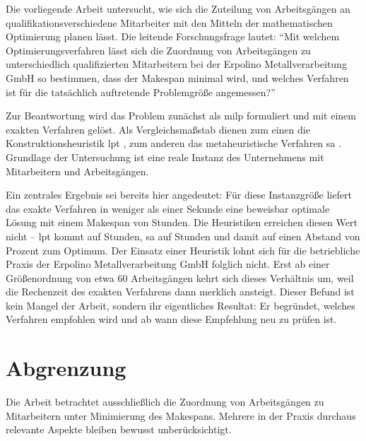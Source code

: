 Die vorliegende Arbeit untersucht, wie sich die Zuteilung von Arbeitsgängen an
qualifikationsverschiedene Mitarbeiter mit den Mitteln der mathematischen
Optimierung planen lässt. Die leitende Forschungsfrage lautet: \enquote{Mit welchem
Optimierungsverfahren lässt sich die Zuordnung von Arbeitsgängen zu unterschiedlich
qualifizierten Mitarbeitern bei der Erpolino Metallverarbeitung GmbH so bestimmen,
dass der Makespan minimal wird, und welches Verfahren ist für die tatsächlich
auftretende Problemgröße angemessen?}

Zur Beantwortung wird das Problem zunächst als \ac{milp} formuliert und mit einem
exakten Verfahren gelöst. Als Vergleichsmaßstab dienen zum einen die
Konstruktionsheuristik \ac{lpt} \parencite{graham1969bounds}, zum anderen das
metaheuristische Verfahren \ac{sa} \parencite{kirkpatrick1983optimization}.
Grundlage der Untersuchung ist eine reale Instanz des Unternehmens mit
\ZahlMitarbeiter{} Mitarbeitern und \ZahlAufgaben{} Arbeitsgängen.

Ein zentrales Ergebnis sei bereits hier angedeutet: Für diese Instanzgröße liefert
das exakte Verfahren in weniger als einer Sekunde eine beweisbar optimale Lösung
mit einem Makespan von \Optimum{} Stunden. Die Heuristiken erreichen diesen Wert
nicht -- \ac{lpt} kommt auf \MakespanLPT{} Stunden, \ac{sa} auf \MakespanSA{}
Stunden und damit auf einen Abstand von \AbstandSA{} Prozent zum Optimum. Der
Einsatz einer Heuristik lohnt sich für die betriebliche Praxis der Erpolino
Metallverarbeitung GmbH folglich nicht. Erst ab einer Größenordnung von etwa
60 Arbeitsgängen kehrt sich dieses Verhältnis um, weil die Rechenzeit des exakten
Verfahrens dann merklich ansteigt. Dieser Befund ist kein Mangel der Arbeit,
sondern ihr eigentliches Resultat: Er begründet, welches Verfahren empfohlen wird
und ab wann diese Empfehlung neu zu prüfen ist.

\section{Abgrenzung}
\label{sec:abgrenzung}

Die Arbeit betrachtet ausschließlich die Zuordnung von Arbeitsgängen zu
Mitarbeitern unter Minimierung des Makespans. Mehrere in der Praxis durchaus
relevante Aspekte bleiben bewusst unberücksichtigt.


